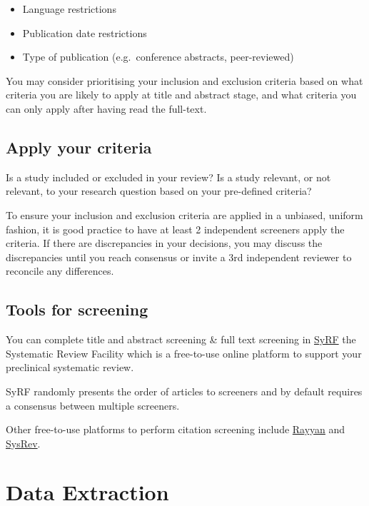 \documentclass[
]{book}
\providecommand{\tightlist}{%
  \setlength{\itemsep}{0pt}\setlength{\parskip}{0pt}}
\begin{document}
\begin{itemize}
\tightlist
\item
  Language restrictions
\item
  Publication date restrictions
\item
  Type of publication (e.g.~conference abstracts, peer-reviewed)
\end{itemize}

You may consider prioritising your inclusion and exclusion criteria based on what criteria you are likely to apply at title and abstract stage, and what criteria you can only apply after having read the full-text.

\hypertarget{apply-your-criteria}{%
\section{Apply your criteria}\label{apply-your-criteria}}

Is a study included or excluded in your review? Is a study relevant, or not relevant, to your research question based on your pre-defined criteria?

To ensure your inclusion and exclusion criteria are applied in a unbiased, uniform fashion, it is good practice to have at least 2 independent screeners apply the criteria. If there are discrepancies in your decisions, you may discuss the discrepancies until you reach consensus or invite a 3rd independent reviewer to reconcile any differences.

\hypertarget{tools-for-screening}{%
\section{Tools for screening}\label{tools-for-screening}}

You can complete title and abstract screening \& full text screening in \href{https://syrf.org.uk/}{SyRF} the Systematic Review Facility which is a free-to-use online platform to support your preclinical systematic review.

SyRF randomly presents the order of articles to screeners and by default requires a consensus between multiple screeners.

Other free-to-use platforms to perform citation screening include \href{https://rayyan.qcri.org/welcome}{Rayyan} and \href{https://sysrev.com/}{SysRev}.

\hypertarget{data-extraction}{%
\chapter{Data Extraction}\label{data-extraction}}
\end{document}
